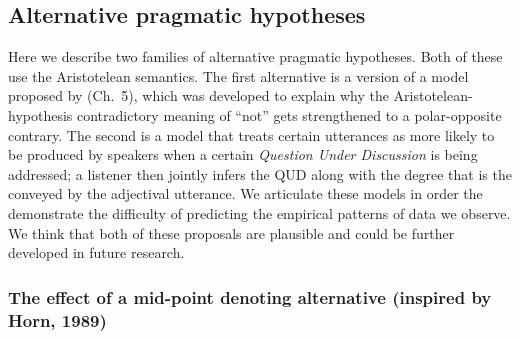 \documentclass[floatsintext,doc]{apa6}
\begin{document}




\subsection{Alternative pragmatic hypotheses}

Here we describe two families of alternative pragmatic hypotheses. Both of these use the Aristotelean semantics. 
The first alternative is a version of a model proposed by  (Ch.~5), which was developed to explain why the Aristotelean-hypothesis contradictory meaning of ``not'' gets strengthened to a polar-opposite contrary.
The second is a model that treats certain utterances as more likely to be produced by speakers when a certain \emph{Question Under Discussion} is being addressed; a listener then jointly infers the QUD along with the degree that is the conveyed by the adjectival utterance.
We articulate these models in order the demonstrate the difficulty of predicting the empirical patterns of data we observe. 
We think that both of these proposals are plausible and could be further developed in future research.


\subsubsection{The effect of a mid-point denoting alternative (inspired by Horn, 1989)}
\end{document}

